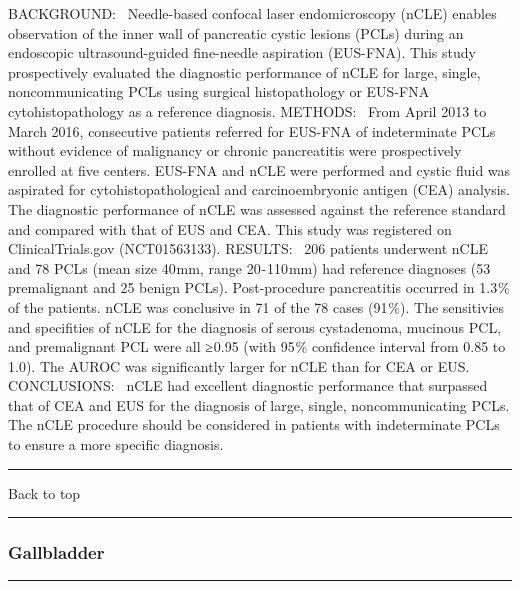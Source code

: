 \documentclass[]{article}
\begin{document}
BACKGROUND:  Needle-based confocal laser endomicroscopy (nCLE) enables
observation of the inner wall of pancreatic cystic lesions (PCLs) during
an endoscopic ultrasound-guided fine-needle aspiration (EUS-FNA). This
study prospectively evaluated the diagnostic performance of nCLE for
large, single, noncommunicating PCLs using surgical histopathology or
EUS-FNA cytohistopathology as a reference diagnosis. METHODS:  From
April 2013 to March 2016, consecutive patients referred for EUS-FNA of
indeterminate PCLs without evidence of malignancy or chronic
pancreatitis were prospectively enrolled at five centers. EUS-FNA and
nCLE were performed and cystic fluid was aspirated for
cytohistopathological and carcinoembryonic antigen (CEA) analysis. The
diagnostic performance of nCLE was assessed against the reference
standard and compared with that of EUS and CEA. This study was
registered on ClinicalTrials.gov (NCT01563133). RESULTS:  206 patients
underwent nCLE and 78 PCLs (mean size 40 mm, range 20 - 110 mm) had
reference diagnoses (53 premalignant and 25 benign PCLs). Post-procedure
pancreatitis occurred in 1.3 \% of the patients. nCLE was conclusive in
71 of the 78 cases (91 \%). The sensitivies and specifities of nCLE for
the diagnosis of serous cystadenoma, mucinous PCL, and premalignant PCL
were all ≥ 0.95 (with 95 \% confidence interval from 0.85 to 1.0). The
AUROC was significantly larger for nCLE than for CEA or EUS.
CONCLUSIONS:  nCLE had excellent diagnostic performance that surpassed
that of CEA and EUS for the diagnosis of large, single, noncommunicating
PCLs. The nCLE procedure should be considered in patients with
indeterminate PCLs to ensure a more specific diagnosis.

{}

{}

\begin{center}\rule{0.5\linewidth}{\linethickness}\end{center}

Back to top

\begin{center}\rule{0.5\linewidth}{\linethickness}\end{center}

\pagebreak

\hypertarget{gallbladder-1}{%
\subsubsection{Gallbladder}\label{gallbladder-1}}

\begin{center}\rule{0.5\linewidth}{\linethickness}\end{center}
\end{document}
